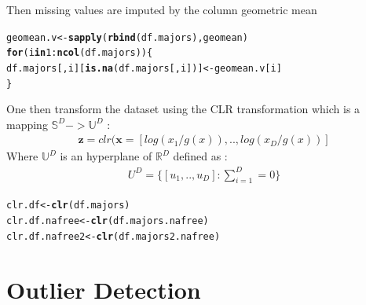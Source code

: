 \documentclass[a4paper,oneside,12pt,titlepage]{article}\usepackage[]{graphicx}\usepackage[]{color}
\makeatletter
\newcommand{\hlnum}[1]{\textcolor[rgb]{0.686,0.059,0.569}{#1}}%
\newcommand{\hlopt}[1]{\textcolor[rgb]{0,0,0}{#1}}%
\newcommand{\hlstd}[1]{\textcolor[rgb]{0.345,0.345,0.345}{#1}}%
\newcommand{\hlkwa}[1]{\textcolor[rgb]{0.161,0.373,0.58}{\textbf{#1}}}%
\newcommand{\hlkwb}[1]{\textcolor[rgb]{0.69,0.353,0.396}{#1}}%
\newcommand{\hlkwd}[1]{\textcolor[rgb]{0.737,0.353,0.396}{\textbf{#1}}}%
\newenvironment{kframe}{%
 \def\at@end@of@kframe{}%
 \ifinner\ifhmode%
  \def\at@end@of@kframe{\end{minipage}}%
  \begin{minipage}{\columnwidth}%
 \fi\fi%
 \def\FrameCommand##1{\hskip\@totalleftmargin \hskip-\fboxsep
 \colorbox{shadecolor}{##1}\hskip-\fboxsep
     \hskip-\linewidth \hskip-\@totalleftmargin \hskip\columnwidth}%
 \MakeFramed {\advance\hsize-\width
   \@totalleftmargin\z@ \linewidth\hsize
   \@setminipage}}%
 {\par\unskip\endMakeFramed%
 \at@end@of@kframe}
\newenvironment{knitrout}{}{} %
\makeatother
\begin{document}
Then  missing values are imputed by the column geometric mean
\begin{knitrout}
\color{fgcolor}\begin{kframe}
\begin{alltt}
\hlstd{geomean.v} \hlkwb{<-} \hlkwd{sapply}\hlstd{(}\hlkwd{rbind}\hlstd{(df.majors),geomean)}
\hlkwa{for} \hlstd{(i} \hlkwa{in} \hlnum{1}\hlopt{:}\hlkwd{ncol}\hlstd{(df.majors))\{}
  \hlstd{df.majors[,i][}\hlkwd{is.na}\hlstd{(df.majors[,i])]} \hlkwb{<-} \hlstd{geomean.v[i]}
\hlstd{\}}
\end{alltt}
\end{kframe}
\end{knitrout}

\noindent One then transform the dataset using the CLR transformation which is a mapping  $\mathbb{S}^D -> \mathbb{U}^D$ :
\begin{align}
\mathbf{z} = clr(\mathbf{x} = [log(x_1/g(x)),..,log(x_D/g(x))]
\end{align}
Where $\mathbb{U}^D$ is an hyperplane of $\mathbb{R}^D$ defined as : 
\begin{align*}
U^D = \Big\{[u_1,..,u_D] : \sum_{i=1}^D = 0  \Big\}
\end{align*}

\begin{knitrout}
\color{fgcolor}\begin{kframe}
\begin{alltt}
\hlstd{clr.df} \hlkwb{<-} \hlkwd{clr}\hlstd{(df.majors)}
\hlstd{clr.df.nafree} \hlkwb{<-} \hlkwd{clr}\hlstd{(df.majors.nafree)}
\hlstd{clr.df.nafree2} \hlkwb{<-} \hlkwd{clr}\hlstd{(df.majors2.nafree)}
\end{alltt}
\end{kframe}
\end{knitrout}

\section{Outlier Detection}
\end{document}
